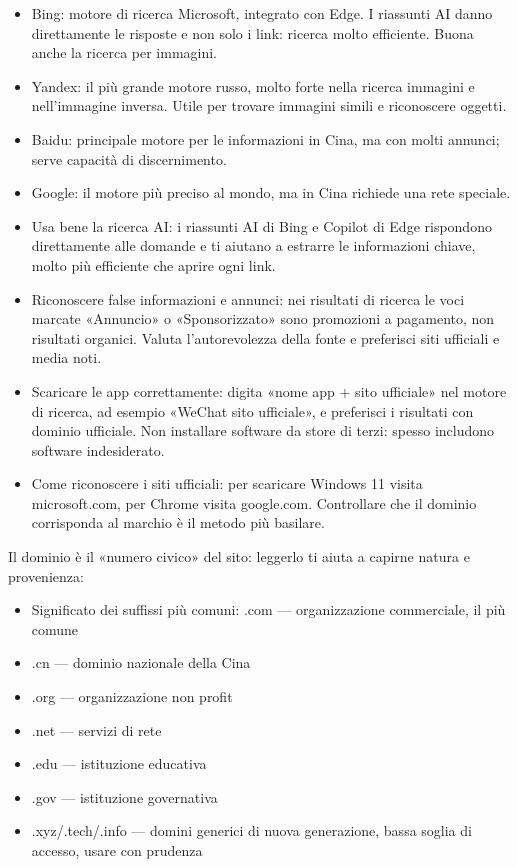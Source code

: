 \begin{itemize}
  \item Bing: motore di ricerca Microsoft, integrato con Edge. I riassunti AI danno direttamente le risposte e non solo i link: ricerca molto efficiente. Buona anche la ricerca per immagini.
  \item Yandex: il più grande motore russo, molto forte nella ricerca immagini e nell'immagine inversa. Utile per trovare immagini simili e riconoscere oggetti.
  \item Baidu: principale motore per le informazioni in Cina, ma con molti annunci; serve capacità di discernimento.
  \item Google: il motore più preciso al mondo, ma in Cina richiede una rete speciale.
\end{itemize}


\begin{itemize}
  \item Usa bene la ricerca AI: i riassunti AI di Bing e Copilot di Edge rispondono direttamente alle domande e ti aiutano a estrarre le informazioni chiave, molto più efficiente che aprire ogni link.
  \item Riconoscere false informazioni e annunci: nei risultati di ricerca le voci marcate «Annuncio» o «Sponsorizzato» sono promozioni a pagamento, non risultati organici. Valuta l'autorevolezza della fonte e preferisci siti ufficiali e media noti.
  \item Scaricare le app correttamente: digita «nome app + sito ufficiale» nel motore di ricerca, ad esempio «WeChat sito ufficiale», e preferisci i risultati con dominio ufficiale. Non installare software da store di terzi: spesso includono software indesiderato.
  \item Come riconoscere i siti ufficiali: per scaricare Windows 11 visita microsoft.com, per Chrome visita google.com. Controllare che il dominio corrisponda al marchio è il metodo più basilare.
\end{itemize}


Il dominio è il «numero civico» del sito: leggerlo ti aiuta a capirne natura e provenienza:

\begin{itemize}
  \item Significato dei suffissi più comuni: .com — organizzazione commerciale, il più comune
  \item .cn — dominio nazionale della Cina
  \item .org — organizzazione non profit
  \item .net — servizi di rete
  \item .edu — istituzione educativa
  \item .gov — istituzione governativa
  \item .xyz/.tech/.info — domini generici di nuova generazione, bassa soglia di accesso, usare con prudenza
\end{itemize}

